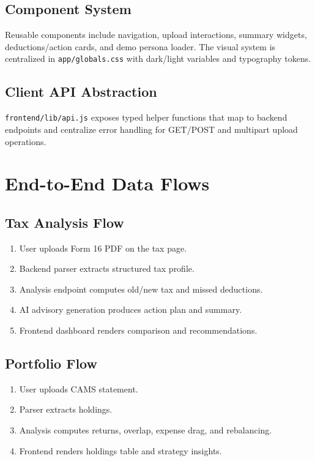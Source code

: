 \documentclass[12pt,a4paper]{article}
\begin{document}
\subsection{Component System}
Reusable components include navigation, upload interactions, summary widgets, deductions/action cards, and demo persona loader. The visual system is centralized in \texttt{app/globals.css} with dark/light variables and typography tokens.

\subsection{Client API Abstraction}
\texttt{frontend/lib/api.js} exposes typed helper functions that map to backend endpoints and centralize error handling for GET/POST and multipart upload operations.

\section{End-to-End Data Flows}
\subsection{Tax Analysis Flow}
\begin{enumerate}
	\item User uploads Form 16 PDF on the tax page.
	\item Backend parser extracts structured tax profile.
	\item Analysis endpoint computes old/new tax and missed deductions.
	\item AI advisory generation produces action plan and summary.
	\item Frontend dashboard renders comparison and recommendations.
\end{enumerate}

\subsection{Portfolio Flow}
\begin{enumerate}
	\item User uploads CAMS statement.
	\item Parser extracts holdings.
	\item Analysis computes returns, overlap, expense drag, and rebalancing.
	\item Frontend renders holdings table and strategy insights.
\end{enumerate}
\end{document}
